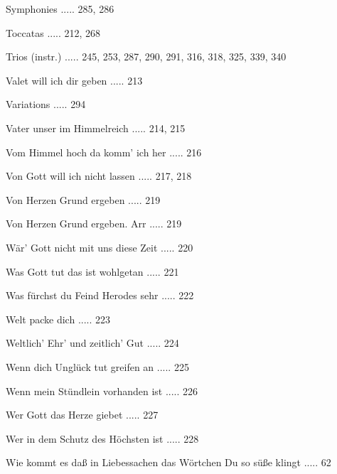 \documentclass[twocolumn]{book}
\begin{document}
\newline 
Symphonies ..... 285, 286

\newline 
Toccatas ..... 212, 268

\newline 
Trios (instr.) ..... 245, 253, 287, 290, 291, 316, 318, 325, 339, 340

\newline 
Valet will ich dir geben ..... 213

\newline 
Variations ..... 294

\newline 
Vater unser im Himmelreich ..... 214, 215

\newline 
Vom Himmel hoch da komm' ich her ..... 216

\newline 
Von Gott will ich nicht lassen ..... 217, 218

\newline 
Von Herzen Grund ergeben ..... 219

\newline 
Von Herzen Grund ergeben. Arr ..... 219

\newline 
Wär' Gott nicht mit uns diese Zeit ..... 220

\newline 
Was Gott tut das ist wohlgetan ..... 221

\newline 
Was fürchst du Feind Herodes sehr ..... 222

\newline 
Welt packe dich ..... 223

\newline 
Weltlich' Ehr' und zeitlich' Gut ..... 224

\newline 
Wenn dich Unglück tut greifen an ..... 225

\newline 
Wenn mein Stündlein vorhanden ist ..... 226

\newline 
Wer Gott das Herze giebet ..... 227

\newline 
Wer in dem Schutz des Höchsten ist ..... 228

\newline 
Wie kommt es daß in Liebessachen das Wörtchen Du so süße klingt ..... 62
\end{document}

